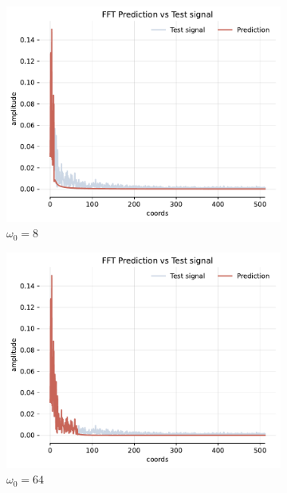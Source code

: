 \begin{figure}[h]
    \begin{subfigure}[b]{0.32\textwidth}
        \centering
        \includegraphics[width=\textwidth]{img/ch3/fft-noise-h0-w8.pdf}
        \caption{$\omega_0=8$}
        \label{fig:fft-noise-shallow-w8}
    \end{subfigure}
    \hfill
    \begin{subfigure}[b]{0.32\textwidth}
        \centering
        \includegraphics[width=\textwidth]{img/ch3/fft-noise-h0-w64.pdf}
        \caption{$\omega_0=64$}
        \label{fig:fft-noise-shallow-w64}
    \end{subfigure}
    \hfill
    \begin{subfigure}[b]{0.32\textwidth}

\end{subfigure}
\end{figure}

